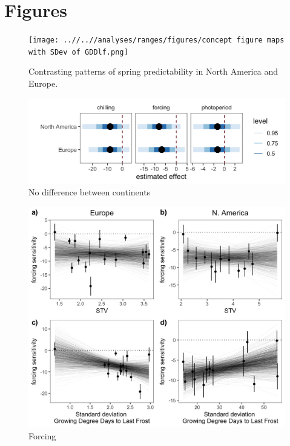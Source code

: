 \documentclass[12pt]{article}
\begin{document}

\section*{Figures}

\begin{figure}[h!]
    \centering
 \texttt{[image: ..//..//analyses/ranges/figures/concept figure maps with SDev of GDDlf.png]} 
    \caption{Contrasting patterns of spring predictability in North America and Europe.}
    \label{fig:mappy}
\end{figure}


\begin{figure}[h!]
    \centering
 \includegraphics[width=\textwidth]{..//..//analyses/ranges/figures/NAvEuPMM.jpeg} 
    \caption{No difference between continents}
    \label{fig:cont}
\end{figure}

\begin{figure}[h!]
    \centering
 \includegraphics[width=\textwidth]{..//..//analyses/ranges/figures/contz_force.jpeg} 
    \caption{Forcing}
    \label{fig:force}
\end{figure}
\end{document}
